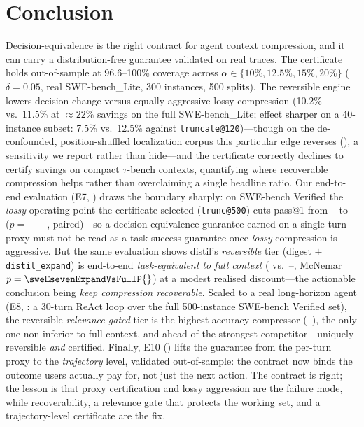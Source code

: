 \documentclass[11pt]{article}
\newcommand{\sweEsevenFullPass}{--}\newcommand{\sweEsevenFullResolved}{--}%
\newcommand{\sweEsevenDistilPass}{--}\newcommand{\sweEsevenDistilResolved}{--}%
\newcommand{\sweEsevenDistilVsFullP}{--}\newcommand{\sweEsevenLinguaVsFullP}{--}%
\newcommand{\sweEeightGatedPass}{--}\newcommand{\sweEeightGatedResolved}{--}%
\begin{document}
\section{Conclusion}
Decision-equivalence is the right contract for agent context compression, and it can
carry a distribution-free guarantee validated on real traces. The certificate
holds out-of-sample at 96.6--100\% coverage across $\alpha \in \{10\%, 12.5\%, 15\%,
20\%\}$ ($\delta=0.05$, real SWE-bench\_Lite, 300 instances, 500 splits). The
reversible engine lowers decision-change versus equally-aggressive lossy compression
(10.2\% vs.\ 11.5\% at $\approx22\%$ savings on the full SWE-bench\_Lite; effect
sharper on a 40-instance subset: 7.5\% vs.\ 12.5\% against \texttt{truncate@120})---though on the de-confounded,
position-shuffled localization corpus this particular edge reverses
(), a sensitivity we report rather than hide---and the certificate
correctly declines to certify savings on compact $\tau$-bench contexts, quantifying
where recoverable compression helps rather than overclaiming a single headline ratio.
Our end-to-end evaluation (E7, ) draws the boundary sharply: on
SWE-bench Verified the \emph{lossy} operating point the certificate selected
(\texttt{trunc@500}) cuts pass@1 from \sweEsevenFullPass{} to \sweEsevenDistilPass{}
($p=\sweEsevenDistilVsFullP{}$, paired)---so a decision-equivalence guarantee earned on a
single-turn proxy must not be read as a task-success guarantee once \emph{lossy}
compression is aggressive. But the same evaluation shows distil's \emph{reversible} tier
(digest $+$ \texttt{distil\_expand}) is end-to-end \emph{task-equivalent to full context}
(\sweEsevenExpandPass{} vs.\ \sweEsevenFullPass{}, McNemar $p=\sweEsevenExpandVsFullP{}$)
at a modest realised discount---the actionable conclusion being \emph{keep compression
recoverable}. Scaled to a real long-horizon agent (E8, : a 30-turn ReAct loop
over the full 500-instance SWE-bench Verified set), the reversible \emph{relevance-gated} tier
is the highest-accuracy compressor (\sweEeightGatedPass{}), the only one non-inferior to full
context, and ahead of the strongest competitor---uniquely reversible \emph{and} certified.
Finally, E10 () lifts the guarantee from the per-turn proxy to the
\emph{trajectory} level, validated out-of-sample: the contract now binds the outcome users
actually pay for, not just the next action. The contract is right; the lesson is that proxy
certification and lossy aggression are the failure mode, while recoverability, a relevance gate
that protects the working set, and a trajectory-level certificate are the fix.
\end{document}
